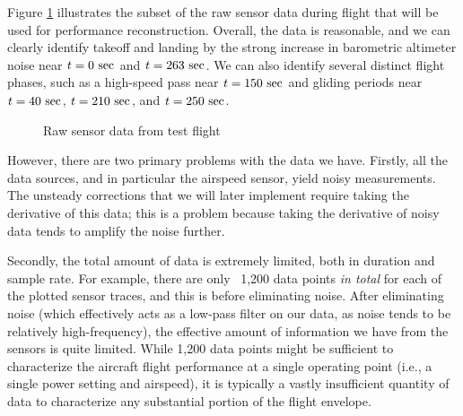 \documentclass[conf]{new-aiaa}
\begin{document}
    Figure \ref{fig:raw_flight_data} illustrates the subset of the raw sensor data during flight that will be used for performance reconstruction. Overall, the data is reasonable, and we can clearly identify takeoff and landing by the strong increase in barometric altimeter noise near $t=0\ \rm sec$ and $t=263\ \rm sec$. We can also identify several distinct flight phases, such as a high-speed pass near $t=150\ \rm sec$ and gliding periods near $t=40\ \rm sec$, $t=210\ \rm sec$, and $t=250\ \rm sec$.

    \begin{figure}[!htb]
        \centering
        \caption{Raw sensor data from test flight}
        \label{fig:raw_flight_data}
    \end{figure}


    However, there are two primary problems with the data we have. Firstly, all the data sources, and in particular the airspeed sensor, yield noisy measurements. The unsteady corrections that we will later implement require taking the derivative of this data; this is a problem because taking the derivative of noisy data tends to amplify the noise further.

    Secondly, the total amount of data is extremely limited, both in duration and sample rate. For example, there are only ~1,200 data points \emph{in total} for each of the plotted sensor traces, and this is before eliminating noise. After eliminating noise (which effectively acts as a low-pass filter on our data, as noise tends to be relatively high-frequency), the effective amount of information we have from the sensors is quite limited. While 1,200 data points might be sufficient to characterize the aircraft flight performance at a single operating point (i.e., a single power setting and airspeed), it is typically a vastly insufficient quantity of data to characterize any substantial portion of the flight envelope.
\end{document}
